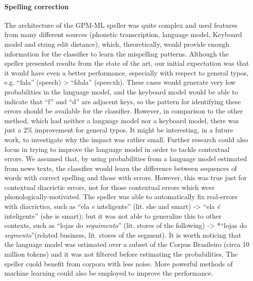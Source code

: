 \paragraph*{Spelling correction}
The architecture of the GPM-ML speller was quite complex and used features from many different sources (phonetic transcription, language model, Keyboard model and string edit distance), which, theoretically, would provide enough information for the classifier to learn the mispelling patterns. Although the speller presented results from the state of the art, our initial expectation was that it would have even a better performance, especially with respect to general typos, e.g. ``fala'' (speech) > ``fdala'' (speecxh). These cases would generate very low probabilities in the language model, and the keyboard model would be able to indicate that ``f'' and ``d'' are adjacent keys, so the pattern for identifying these errors should be available for the classifier. However, in comparison to the other method, which had neither a language model nor a keyboard model, there was just a 2\% improvement for general typos. It 
might be interesting, in a future work, to investigate why the impact was rather small. Further research could also focus in trying to improve the language model in order to tackle contextual errors. We assumed that, by using probabilities from a language model estimated from news texts, the classifier would learn the difference between sequences of words with correct spelling and those with errors. However, this was true just for contextual diacrictic errors, not for those contextual errors which were phonologically-motivated. The speller was able to automatically fix real-errors with diacrictics, such as ``ela \emph{e} inteligente'' (lit. she and smart) -> ``ela \emph{é} inteligente'' (she is smart); but it was not able to generalize this to other contexts, such as ``lojas do \emph{seguimento}'' (lit. stores of the following) -> *``lojas do \emph{segmento}''(related business, lit. stores of the segment). It is worth noticing that the language model was estimated over a subset of the Corpus Brasileiro (circa 10 million tokens) and it was not filtered before estimating the probabilities. The speller cuold benefit from corpora with less noise.  More powerful methods of machine learning could also be employed to improve the performance.

